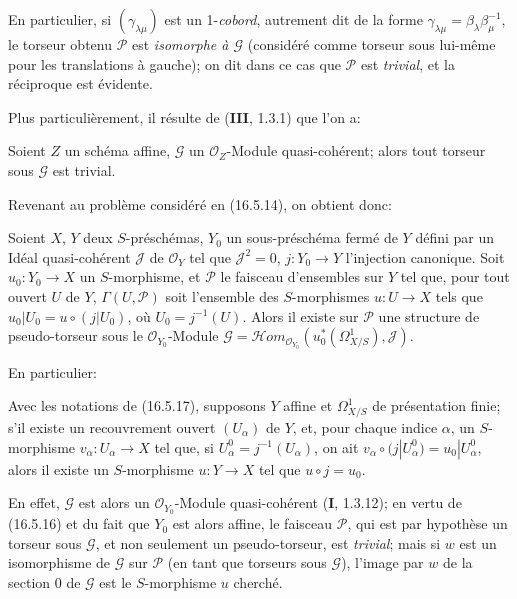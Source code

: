 \begin{env}[16.5.15]
En particulier, si $(\gamma_{\lambda\mu})$ est un 1-\emph{cobord}, autrement
dit de la forme
$\gamma_{\lambda\mu}=\beta_\lambda\beta_\mu^{-1}$, le torseur obtenu
$\mathscr{P}$ est \emph{isomorphe à $\mathscr{G}$} (considéré comme torseur
sous lui-même pour les translations à gauche); on dit dans ce cas que
$\mathscr{P}$ est \emph{trivial}, et la réciproque est évidente.

Plus particulièrement, il résulte de (\textbf{III}, 1.3.1) que l'on a:
\end{env}

\begin{proposition}[16.5.16]
\label{IV.16.5.16}
Soient $Z$ un schéma affine, $\mathscr{G}$ un $\mathcal{O}_Z$-Module
quasi-cohérent; alors tout torseur sous $\mathscr{G}$ est trivial.
\end{proposition}

Revenant au problème considéré en (16.5.14), on obtient donc:

\begin{proposition}[16.5.17]
\label{IV.16.5.17}
Soient $X$, $Y$ deux $S$-préschémas, $Y_0$ un sous-préschéma fermé de $Y$
défini par un Idéal quasi-cohérent $\mathscr{J}$ de $\mathcal{O}_Y$ tel que
$\mathscr{J}^2=0$, $j:Y_0\to Y$ l'injection canonique. Soit
$u_0:Y_0\to X$ un $S$-morphisme, et $\mathscr{P}$ le faisceau d'ensembles sur
$Y$ tel que, pour tout ouvert $U$ de $Y$, $\Gamma(U,\mathscr{P})$ soit
l'ensemble des $S$-morphismes $u:U\to X$ tels que
$u_0|U_0=u\circ(j|U_0)$, où $U_0=j^{-1}(U)$. Alors il existe sur
$\mathscr{P}$ une structure de pseudo-torseur sous le
$\mathcal{O}_{Y_0}$-Module
$\mathscr{G}=\mathscr{H}om_{\mathcal{O}_{Y_0}}(u_0^*(\varOmega_{X/S}^1),\mathscr{J})$.
\end{proposition}

En particulier:

\begin{corollary}[16.5.18]
\label{IV.16.5.18}
Avec les notations de \textup{(16.5.17)}, supposons $Y$ affine et $\varOmega_{X/S}^1$ de
présentation finie; s'il existe un recouvrement ouvert $(U_\alpha)$ de $Y$,
et, pour chaque indice $\alpha$, un $S$-morphisme $v_\alpha:U_\alpha\to X$
tel que, si $U_\alpha^0=j^{-1}(U_\alpha)$, on ait
$v_\alpha\circ(j|U_\alpha^0)=u_0|U_\alpha^0$, alors il existe un
$S$-morphisme $u:Y\to X$ tel que $u\circ j=u_0$.
\end{corollary}

En effet, $\mathscr{G}$ est alors un $\mathcal{O}_{Y_0}$-Module
quasi-cohérent (\textbf{I}, 1.3.12); en vertu de (16.5.16) et du fait que $Y_0$ est
alors affine, le faisceau $\mathscr{P}$, qui est par hypothèse un torseur sous
$\mathscr{G}$, et non seulement un pseudo-torseur, est \emph{trivial}; mais si
$w$ est un isomorphisme de $\mathscr{G}$ sur $\mathscr{P}$ (en tant que
torseurs sous $\mathscr{G}$), l'image par $w$ de la section 0 de
$\mathscr{G}$ est le $S$-morphisme $u$ cherché.

